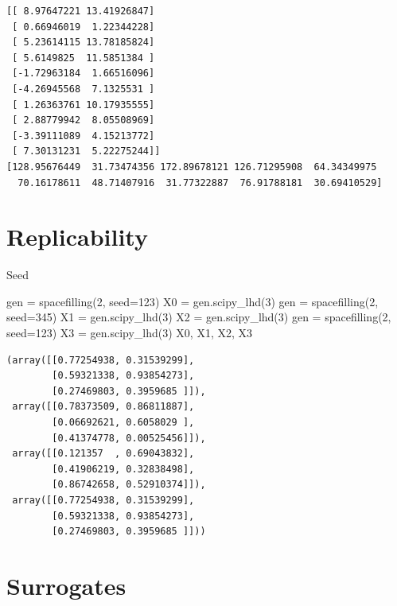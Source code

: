 \documentclass[
  letterpaper,
  DIV=11,
  numbers=noendperiod]{scrreprt}
\newenvironment{Shaded}{\begin{snugshade}}{\end{snugshade}}
\newcommand{\DecValTok}[1]{\textcolor[rgb]{0.68,0.00,0.00}{#1}}
\newcommand{\NormalTok}[1]{\textcolor[rgb]{0.00,0.23,0.31}{#1}}
\newcommand{\OperatorTok}[1]{\textcolor[rgb]{0.37,0.37,0.37}{#1}}
\begin{document}
\begin{verbatim}
[[ 8.97647221 13.41926847]
 [ 0.66946019  1.22344228]
 [ 5.23614115 13.78185824]
 [ 5.6149825  11.5851384 ]
 [-1.72963184  1.66516096]
 [-4.26945568  7.1325531 ]
 [ 1.26363761 10.17935555]
 [ 2.88779942  8.05508969]
 [-3.39111089  4.15213772]
 [ 7.30131231  5.22275244]]
[128.95676449  31.73474356 172.89678121 126.71295908  64.34349975
  70.16178611  48.71407916  31.77322887  76.91788181  30.69410529]
\end{verbatim}

\section{Replicability}\label{replicability}

Seed

\begin{Shaded}
\begin{Highlighting}[]
\NormalTok{gen }\OperatorTok{=}\NormalTok{ spacefilling(}\DecValTok{2}\NormalTok{, seed}\OperatorTok{=}\DecValTok{123}\NormalTok{)}
\NormalTok{X0 }\OperatorTok{=}\NormalTok{ gen.scipy\_lhd(}\DecValTok{3}\NormalTok{)}
\NormalTok{gen }\OperatorTok{=}\NormalTok{ spacefilling(}\DecValTok{2}\NormalTok{, seed}\OperatorTok{=}\DecValTok{345}\NormalTok{)}
\NormalTok{X1 }\OperatorTok{=}\NormalTok{ gen.scipy\_lhd(}\DecValTok{3}\NormalTok{)}
\NormalTok{X2 }\OperatorTok{=}\NormalTok{ gen.scipy\_lhd(}\DecValTok{3}\NormalTok{)}
\NormalTok{gen }\OperatorTok{=}\NormalTok{ spacefilling(}\DecValTok{2}\NormalTok{, seed}\OperatorTok{=}\DecValTok{123}\NormalTok{)}
\NormalTok{X3 }\OperatorTok{=}\NormalTok{ gen.scipy\_lhd(}\DecValTok{3}\NormalTok{)}
\NormalTok{X0, X1, X2, X3}
\end{Highlighting}
\end{Shaded}

\begin{verbatim}
(array([[0.77254938, 0.31539299],
        [0.59321338, 0.93854273],
        [0.27469803, 0.3959685 ]]),
 array([[0.78373509, 0.86811887],
        [0.06692621, 0.6058029 ],
        [0.41374778, 0.00525456]]),
 array([[0.121357  , 0.69043832],
        [0.41906219, 0.32838498],
        [0.86742658, 0.52910374]]),
 array([[0.77254938, 0.31539299],
        [0.59321338, 0.93854273],
        [0.27469803, 0.3959685 ]]))
\end{verbatim}

\section{Surrogates}\label{surrogates-1}
\end{document}

